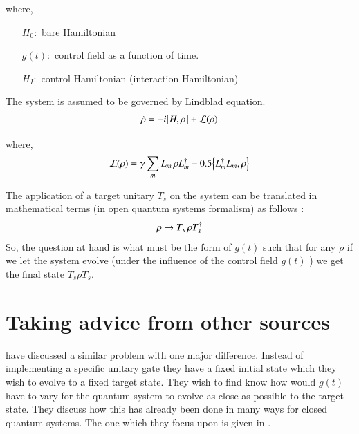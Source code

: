 where,
\begin{enumerate}
    \item[$H_{0} :$] bare Hamiltonian
    \item[$ g(t) :$] control field as a function of time.
    \item[$ H _{ I} :$] control Hamiltonian (interaction Hamiltonian)
\end{enumerate}

The system is assumed to be governed by Lindblad equation.
\begin{align}
    \dot{\rho} = - i\comm{H}{\rho} + \mathcal{L}(\rho)
\end{align}

where,
\[
 \mathcal{L}(\rho) = \gamma\sum_{m} L_{m}\thinspace \rho L_{m}^{\dagger} - 0.5 \anticommutator{L_{m}^{\dagger}L_{m}}{ \rho}
\]

The application of a target unitary $T_{s} $ on the system can be translated in mathematical terms (in open quantum systems formalism) as follows :
\[
 \rho \rightarrow T_{s}\thinspace  \rho T_{s} ^{\dagger}
\]
So, the question at hand is what must be the form of $ g (t)$
 such that for any $\rho $ if we let the system evolve (under the influence of the  control field  $g (t) $ ) we get the final state $T_{s} \rho  T_{s} ^{\dagger}$.

\section{Taking advice from other sources}
\cite{2018EPJST.227..203S} have  discussed a similar problem with one major difference. Instead of implementing a specific unitary gate they have a fixed initial state which they wish to evolve to a fixed target state.  They wish to find know how would $ g(t)$ have to vary for the quantum system to evolve as close as possible to the target state. They discuss how this has already been done in many ways for closed quantum systems. The one which they focus upon is given in \cite{2012JChPh.136j4103R}.


